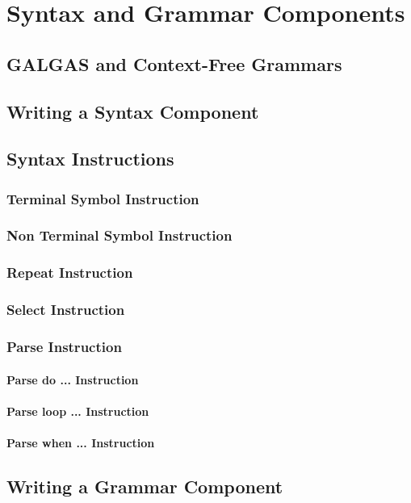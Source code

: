 
\chapter{Syntax and Grammar Components}

\section {GALGAS and Context-Free Grammars}


\section{Writing a Syntax Component}

\section{Syntax Instructions}

\subsection{Terminal Symbol Instruction}

\subsection{Non Terminal Symbol Instruction}


\subsection{Repeat Instruction}


\subsection{Select Instruction}



\subsection{Parse Instruction}

\subsubsection{Parse do ... Instruction}


\subsubsection{Parse loop ... Instruction}


\subsubsection{Parse when ... Instruction}


\section{Writing a Grammar Component}

